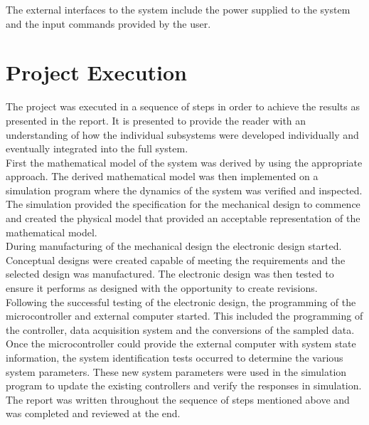 The external interfaces to the system include the power supplied to the system and the input commands provided by the user.

\section{Project Execution}

The project was executed in a sequence of steps in order to achieve the results as presented in the report. It is presented to provide the reader with an understanding of how the individual subsystems were developed individually and eventually integrated into the full system.\\
 
First the mathematical model of the system was derived by using the appropriate approach. The derived mathematical model was then implemented on a simulation program where the dynamics of the system was verified and inspected.\\

The simulation provided the specification for the mechanical design to commence and created the physical model that provided an acceptable representation of the mathematical model.\\

During manufacturing of the mechanical design the electronic design started. Conceptual designs were created capable of meeting the requirements and the selected design was manufactured. The electronic design was then tested to ensure it performs as designed with the opportunity to create revisions.\\

Following the successful testing of the electronic design, the programming of the microcontroller and external computer started. This included the programming of the controller, data acquisition system and the conversions of the sampled data.\\

Once the microcontroller could provide the external computer with system state information, the system identification tests occurred to determine the various system parameters. These new system parameters were used in the simulation program to update the existing controllers and verify the responses in simulation.\\

The report was written throughout the sequence of steps mentioned above and was completed and reviewed at the end.


